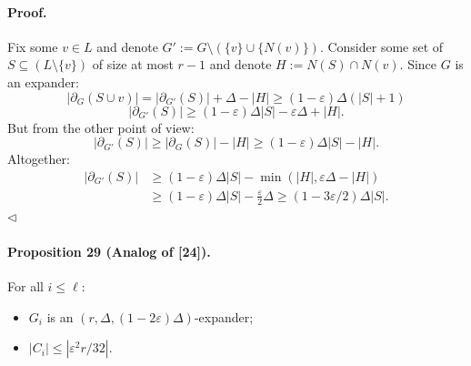 \documentclass[10pt,a4paper]{article}
\begin{document}
\paragraph{Proof.} Fix some $v\in L$ and denote $G':=G\setminus(\{v\}\cup\{N(v)\})$.
Consider some set of $S\subseteq(L\setminus\{v\})$ of size at most $r-1$ and denote $H:=N(S)\cap N(v)$. Since $G$ is an expander:
\[|\partial_G(S\cup v)|=|\partial_{G'}(S)|+\Delta-|H|\geq(1-\varepsilon)\Delta(|S|+1)\]
\[|\partial_{G'}(S)|\geq(1-\varepsilon)\Delta|S|-\varepsilon\Delta+|H|.\]
But from the other point of view:
\[|\partial_{G'}(S)|\geq|\partial_G(S)|-|H|\geq(1-\varepsilon)\Delta|S|-|H|.\]
Altogether:
\begin{align*}
|\partial_{G'}(S)|&\geq(1-\varepsilon)\Delta|S|-\min(|H|,\varepsilon\Delta-|H|)\\
&\geq(1-\varepsilon)\Delta|S|-\frac\varepsilon2\Delta\geq(1-3\varepsilon/2)\Delta|S|.
\end{align*}\hfill$\triangleleft$
\paragraph{Proposition 29 (Analog of [24]).} For all $i\leq\ell$:
\begin{itemize}
\item $G_i$ is an $(r,\Delta,(1-2\varepsilon)\Delta)$-expander;
\item $|C_i|\leq|\varepsilon^2r/32|$.
\end{itemize}
\end{document}
